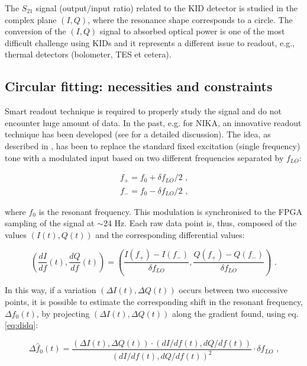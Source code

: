 \documentclass[twocolumn,traditabstract]{aa}\\
\begin{document}
The $S_{21}$ signal (output/input ratio) related to the KID detector is studied in the complex plane $(I,Q)$, where the resonance shape corresponds to a circle.
The conversion of the $(I,Q)$ signal to absorbed optical power is one of the most difficult challenge using KIDs and it represents a different issue to readout, e.g., thermal detectors (bolometer, TES et cetera).

\subsection{Circular fitting: necessities and constraints}

Smart readout technique is required to properly study the signal and do not encounter huge amount of data. In the past, e.g. for NIKA, an innovative readout technique has been developed (see \cite{Calvo2013} for a detailed discussion). 
The idea, as described in \cite{Catalano2014} , has been to replace the standard fixed excitation (single frequency) tone with a modulated input based on two different frequencies separated by $f_{LO}$: 

\begin{equation}
\begin{align}
f_+ = f_0 + \delta f_{LO}/2 \text{ ,}
\\
f_- = f_0 - \delta f_{LO}/2 \text{ ,}
\end{align}
\end{equation}

\noindent where $f_0$ is the resonant frequency. This modulation is synchronised to the FPGA sampling of the signal at $\sim$24 Hz. Each raw data point is, thus, composed of the values $(I(t), Q(t))$ and the corresponding differential values:

\begin{equation}
\left( \frac{dI}{df}(t),\frac{dQ}{df}(t) \right) = \left( \frac{I(f_+)-I(f_-)}{\delta f_{LO}}, \frac{Q(f_+)-Q(f_-)}{\delta f_{LO}} \right) \text{ .}
\label{eq:didq}
\end{equation}

\noindent In this way, if a variation $(\Delta I(t), \Delta Q(t))$ occurs between two successive points, it is possible to estimate the corresponding shift in the resonant frequency, $\Delta f_0(t)$, by projecting
$(\Delta I(t), \Delta Q(t))$ along the gradient found, using 
eq. \ref{eq:didq}:

\begin{equation}
\Delta \hat{f}_0 (t) = \frac{(\Delta I(t), \Delta Q(t))\cdot (dI/df(t),dQ/df(t)  ) }{ ( dI/df(t), dQ/df(t) )^2 }\cdot\delta f_{LO} \text{ ,}
\end{equation}
\end{document}
